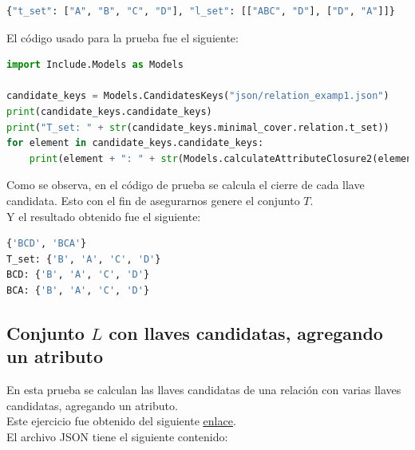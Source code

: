 \documentclass[a4paper,12pt]{article}
\begin{document}
{\begin{lstlisting}[language=python, caption={Archivo JSON con varias llaves candidatas.\\\hspace{\textwidth}}, captionpos=t]
{"t_set": ["A", "B", "C", "D"], "l_set": [["ABC", "D"], ["D", "A"]]}
\end{lstlisting}

El código usado para la prueba fue el siguiente:

\begin{lstlisting}[language=python, caption={Prueba con una relación con varias llaves candidatas.\\\hspace{\textwidth}}, captionpos=t]
import Include.Models as Models

candidate_keys = Models.CandidatesKeys("json/relation_examp1.json")
print(candidate_keys.candidate_keys)
print("T_set: " + str(candidate_keys.minimal_cover.relation.t_set))
for element in candidate_keys.candidate_keys:
    print(element + ": " + str(Models.calculateAttributeClosure2(element,candidate_keys.minimal_cover.irreducible_rel.l_set)))

\end{lstlisting}
Como se observa, en el código de prueba se calcula el cierre de cada llave candidata. Esto con el fin de asegurarnos genere el conjunto $T$.
\\
Y el resultado obtenido fue el siguiente:

\begin{lstlisting}[language=bash, caption={Resultado de llaves candidatas.\\\hspace{\textwidth}}, captionpos=t]
{'BCD', 'BCA'}
T_set: {'B', 'A', 'C', 'D'}
BCD: {'B', 'A', 'C', 'D'}
BCA: {'B', 'A', 'C', 'D'}
\end{lstlisting}

\subsection{Conjunto $L$ con llaves candidatas, agregando un atributo}
En esta prueba se calculan las llaves candidatas de una relación con varias llaves candidatas, agregando un atributo.
\\
Este ejercicio fue obtenido del siguiente \href{https://djitz.com/neu-mscs/how-to-find-candidate-keys/}{\underline{enlace}}.
\\
El archivo JSON tiene el siguiente contenido:

}
\end{document}
